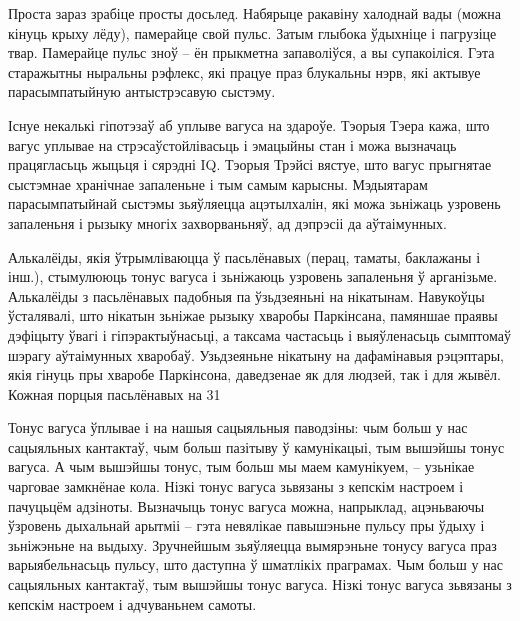 Проста зараз зрабіце просты досьлед. Набярыце ракавіну халоднай вады (можна кінуць крыху лёду), памерайце свой пульс. Затым глыбока ўдыхніце і пагрузіце твар. Памерайце пульс зноў – ён прыкметна запаволіўся, а вы супакоіліся. Гэта старажытны ныральны рэфлекс, які працуе праз блукальны нэрв, які актывуе парасымпатыйную антыстрэсавую сыстэму.

Існуе некалькі гіпотэзаў аб уплыве вагуса на здароўе. Тэорыя Тэера кажа, што вагус уплывае на стрэсаўстойлівасьць і эмацыйны стан і можа вызначаць працягласьць жыцьця і сярэдні IQ. Тэорыя Трэйсі вястуе, што вагус прыгнятае сыстэмнае хранічнае запаленьне і тым самым карысны. Мэдыятарам парасымпатыйнай сыстэмы зьяўляецца ацэтылхалін, які можа зьніжаць узровень запаленьня і рызыку многіх захворваньняў, ад дэпрэсіі да аўтаімунных.

Алькалёіды, якія ўтрымліваюцца ў пасьлёнавых (перац, таматы, баклажаны і інш.), стымулююць тонус вагуса і зьніжаюць узровень запаленьня ў арганізьме. Алькалёіды з пасьлёнавых падобныя па ўзьдзеяньні на нікатынам. Навукоўцы ўсталявалі, што нікатын зьніжае рызыку хваробы Паркінсана, памяншае праявы дэфіцыту ўвагі і гіпэрактыўнасьці, а таксама частасьць і выяўленасьць сымптомаў шэрагу аўтаімунных хваробаў. Узьдзеяньне нікатыну на дафамінавыя рэцэптары, якія гінуць пры хваробе Паркінсона, даведзенае як для людзей, так і для жывёл. Кожная порцыя пасьлёнавых на 31%

Тонус вагуса ўплывае і на нашыя сацыяльныя паводзіны: чым больш у нас сацыяльных кантактаў, чым больш пазітыву ў камунікацыі, тым вышэйшы тонус вагуса. А чым вышэйшы тонус, тым больш мы маем камунікуем, -- узьнікае чарговае замкнёнае кола. Нізкі тонус вагуса зьвязаны з кепскім настроем і пачуцьцём адзіноты. Вызначыць тонус вагуса можна, напрыклад, ацэньваючы ўзровень дыхальнай арытміі – гэта невялікае павышэньне пульсу пры ўдыху і зьніжэньне на выдыху. Зручнейшым зьяўляецца вымярэньне тонусу вагуса праз варыябельнасьць пульсу, што даступна ў шматлікіх праграмах. Чым больш у нас сацыяльных кантактаў, тым вышэйшы тонус вагуса. Нізкі тонус вагуса зьвязаны з кепскім настроем і адчуваньнем самоты.

